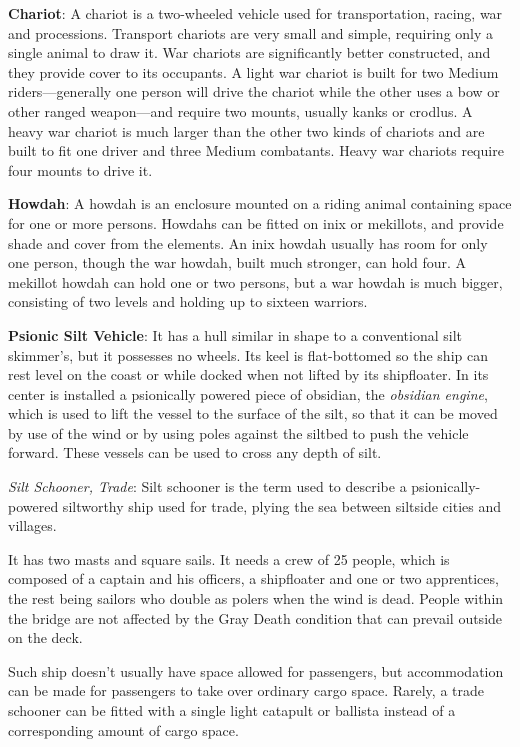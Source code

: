 \textbf{Chariot}: A chariot is a two-wheeled vehicle used for transportation, racing, war and processions. Transport chariots are very small and simple, requiring only a single animal to draw it. War chariots are significantly better constructed, and they provide cover to its occupants. A light war chariot is built for two Medium riders---generally one person will drive the chariot while the other uses a bow or other ranged weapon---and require two mounts, usually kanks or crodlus. A heavy war chariot is much larger than the other two kinds of chariots and are built to fit one driver and three Medium combatants. Heavy war chariots require four mounts to drive it.

\textbf{Howdah}: A howdah is an enclosure mounted on a riding animal containing space for one or more persons. Howdahs can be fitted on inix or mekillots, and provide shade and cover from the elements. An inix howdah usually has room for only one person, though the war howdah, built much stronger, can hold four. A mekillot howdah can hold one or two persons, but a war howdah is much bigger, consisting of two levels and holding up to sixteen warriors.

\textbf{Psionic Silt Vehicle}: It has a hull similar in shape to a conventional silt skimmer's, but it possesses no wheels. Its keel is flat-bottomed so the ship can rest level on the coast or while docked when not lifted by its shipfloater. In its center is installed a psionically powered piece of obsidian, the \emph{obsidian engine}, which is used to lift the vessel to the surface of the silt, so that it can be moved by use of the wind or by using poles against the siltbed to push the vehicle forward. These vessels can be used to cross any depth of silt.

\textit{Silt Schooner, Trade}: Silt schooner is the term used to describe a psionically-powered siltworthy ship used for trade, plying the sea between siltside cities and villages.

It has two masts and square sails. It needs a crew of 25 people, which is composed of a captain and his officers, a shipfloater and one or two apprentices, the rest being sailors who double as polers when the wind is dead. People within the bridge are not affected by the Gray Death condition that can prevail outside on the deck.

Such ship doesn't usually have space allowed for passengers, but accommodation can be made for passengers to take over ordinary cargo space. Rarely, a trade schooner can be fitted with a single light catapult or ballista instead of a corresponding amount of cargo space.

